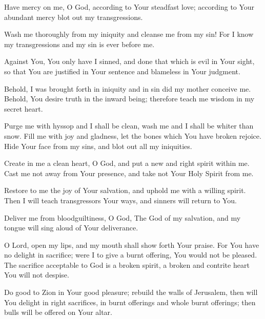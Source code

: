 Have mercy on me, O God, according to Your steadfast love; according to Your abundant mercy blot out my transgressions.

Wash me thoroughly from my iniquity and cleanse me from my sin! For I know my transgressions and my sin is ever before me.

Against You, You only have I sinned, and done that which is evil in Your sight, so that You are justified in Your sentence and blameless in Your judgment.

Behold, I was brought forth in iniquity and in sin did my mother conceive me. Behold, You desire truth in the inward being; therefore teach me wisdom in my secret heart.

Purge me with hyssop and I shall be clean, wash me and I shall be whiter than snow.  Fill me with joy and gladness, let the bones which You have broken	rejoice.  Hide Your face from my sins, and blot out all my iniquities.

Create in me a clean heart, O God, and put a new and right spirit within me. Cast me not away from Your presence, and take not Your Holy Spirit from me.

Restore to me the joy of Your salvation, and uphold me with a willing spirit. Then I will teach transgressors Your ways, and sinners will return to You.

Deliver me from bloodguiltiness, O God, The God of my salvation, and my tongue will sing aloud of Your deliverance.

O Lord, open my lips, and my mouth shall show forth Your praise.  For You have no delight in sacrifice; were I to give a burnt offering, You would not be pleased. The sacrifice acceptable to God is a broken spirit, a broken and contrite heart You will not despise.

Do good to Zion in Your good pleasure; rebuild the walls of Jerusalem, then will You delight in right sacrifices, in burnt offerings and whole burnt offerings; then bulls will be offered on Your altar.